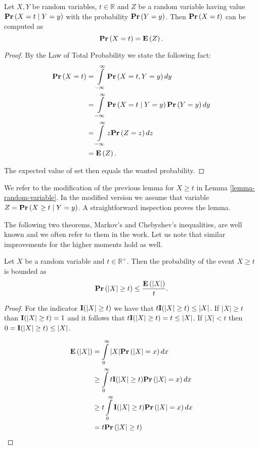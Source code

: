 \begin{lemma}
\label{lemma-expect-probability}
Let $X, Y$ be random variables, $t \in \mathbb{R}$ and $Z$ be a random variable having value $\mathbf{Pr}\left(X = t \mid Y = y\right)$ with the probability $\mathbf{Pr}\left(Y = y\right)$. Then $\mathbf{Pr}\left(X = t\right)$ can be computed as
\[
\mathbf{Pr}\left(X = t\right) = \mathbf{E}\left(Z\right) \text{.}
\]
\end{lemma}
\begin{proof}
By the Law of Total Probability we state the following fact:
\[
\begin{split}
\mathbf{Pr}\left(X = t\right) 
	& = \int\limits_{-\infty}^{\infty} \mathbf{Pr}\left(X = t, Y = y\right) dy \\
	& = \int\limits_{-\infty}^{\infty} \mathbf{Pr}\left(X = t \mid Y = y\right) \mathbf{Pr}\left(Y = y\right) dy \\
	& = \int\limits_{-\infty}^{\infty} z \mathbf{Pr}\left(Z = z\right) dz \\
	& = \mathbf{E}\left(Z\right) \text{.}
\end{split}
\]

The expected value of set then equals the wanted probability.
\end{proof}

We refer to the modification of the previous lemma for $X \geq t$ in Lemma \ref{lemma-random-variable}. In the modified version we assume that variable $Z = \mathbf{Pr}\left(X \geq t \mid Y = y\right)$. A straightforward inspection proves the lemma.

The following two theorems, Markov's \cite{557945} and Chebyshev's \cite{pFEL66a} inequalities, are well known and we often refer to them in the work. Let us note that similar improvements for the higher moments hold as well.
\begin{theorem}
\label{theorem-markov-inequality}
Let $X$ be a random variable and $t \in \mathbb{R}^{+}$. Then the probability of the event $X \geq t$ is bounded as
\[
\mathbf{Pr}\left(|X| \geq t\right) \leq \frac{\mathbf{E}\left(|X|\right)}{t} \text{.}
\]
\end{theorem}
\begin{proof}
For the indicator $\mathbf{I}(|X| \geq t)$ we have that $t\mathbf{I}(|X| \geq t) \leq |X|$. If $|X| \geq t$ than $\mathbf{I}(|X| \geq t) = 1$ and it follows that $t\mathbf{I}(|X| \geq t) = t \leq |X|$. If $|X| < t$ then $0 = \mathbf{I}(|X| \geq t) \leq |X|$.

\[
\begin{split}
\mathbf{E}\left(|X|\right) 
	& = \int\limits_{0}^{\infty} |X| \mathbf{Pr}\left(|X| = x\right) dx \\
	& \geq \int\limits_{0}^{\infty} t \mathbf{I}(|X| \geq t) \mathbf{Pr}\left(|X| = x\right) dx \\
	& \geq t \int\limits_{0}^{\infty} \mathbf{I}(|X| \geq t) \mathbf{Pr}\left(|X| = x\right) dx \\
	& = t \mathbf{Pr}\left(|X| \geq t\right) \\
\end{split}
\]
\end{proof}

